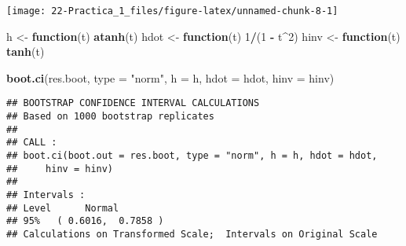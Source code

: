 \documentclass[
]{book}
\newenvironment{Shaded}{\begin{snugshade}}{\end{snugshade}}
\newcommand{\CommentTok}[1]{\textcolor[rgb]{0.56,0.35,0.01}{\textit{#1}}}
\newcommand{\ControlFlowTok}[1]{\textcolor[rgb]{0.13,0.29,0.53}{\textbf{#1}}}
\newcommand{\DataTypeTok}[1]{\textcolor[rgb]{0.13,0.29,0.53}{#1}}
\newcommand{\DecValTok}[1]{\textcolor[rgb]{0.00,0.00,0.81}{#1}}
\newcommand{\KeywordTok}[1]{\textcolor[rgb]{0.13,0.29,0.53}{\textbf{#1}}}
\newcommand{\NormalTok}[1]{#1}
\newcommand{\OperatorTok}[1]{\textcolor[rgb]{0.81,0.36,0.00}{\textbf{#1}}}
\newcommand{\OtherTok}[1]{\textcolor[rgb]{0.56,0.35,0.01}{#1}}
\newcommand{\StringTok}[1]{\textcolor[rgb]{0.31,0.60,0.02}{#1}}
\theoremstyle{definition}
\theoremstyle{definition}
\theoremstyle{definition}
\theoremstyle{remark}
\begin{document}
\begin{center}\texttt{[image: 22-Practica\_1\_files/figure-latex/unnamed-chunk-8-1]} \end{center}

\begin{Shaded}
\begin{Highlighting}[]
\NormalTok{h <-}\StringTok{ }\ControlFlowTok{function}\NormalTok{(t) }\KeywordTok{atanh}\NormalTok{(t)}
\NormalTok{hdot <-}\StringTok{ }\ControlFlowTok{function}\NormalTok{(t) }\DecValTok{1}\OperatorTok{/}\NormalTok{(}\DecValTok{1} \OperatorTok{-}\StringTok{ }\NormalTok{t}\OperatorTok{^}\DecValTok{2}\NormalTok{)}
\NormalTok{hinv <-}\StringTok{ }\ControlFlowTok{function}\NormalTok{(t) }\KeywordTok{tanh}\NormalTok{(t)}

\KeywordTok{boot.ci}\NormalTok{(res.boot, }\DataTypeTok{type =} \StringTok{"norm"}\NormalTok{, }\DataTypeTok{h =}\NormalTok{ h, }\DataTypeTok{hdot =}\NormalTok{ hdot, }\DataTypeTok{hinv =}\NormalTok{ hinv)}
\end{Highlighting}
\end{Shaded}

\begin{verbatim}
## BOOTSTRAP CONFIDENCE INTERVAL CALCULATIONS
## Based on 1000 bootstrap replicates
## 
## CALL : 
## boot.ci(boot.out = res.boot, type = "norm", h = h, hdot = hdot, 
##     hinv = hinv)
## 
## Intervals : 
## Level      Normal        
## 95%   ( 0.6016,  0.7858 )  
## Calculations on Transformed Scale;  Intervals on Original Scale
\end{verbatim}

\begin{Shaded}
\end{Shaded}
\end{document}
